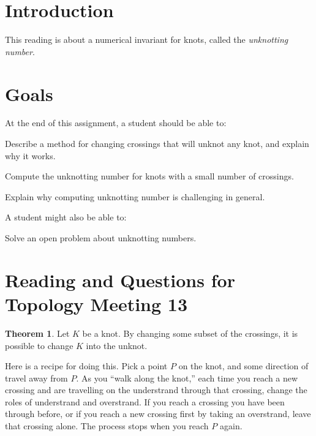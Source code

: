 \documentclass[12pt,letterpaper]{article}
\theoremstyle{definition}
\newtheorem*{theorem}{Theorem}
\begin{document}
\setlength{\parskip}{1ex plus 0.5ex minus 0.2ex}
\setlength{\parindent}{0pt}

\pagestyle{fancy}
\cfoot{}

\section*{Introduction}
This reading is about a numerical invariant for knots, called the \emph{unknotting number}.

\section*{Goals}
At the end of this assignment, a student should be able to:
\begin{compactitem}
\item Describe a method for changing crossings that will unknot any knot, and explain why it works.
\item Compute the unknotting number for knots with a small number of crossings.
\item Explain why computing unknotting number is challenging in general.
\end{compactitem}
A student might also be able to:
\begin{compactitem}
\item Solve an open problem about unknotting numbers.
\end{compactitem}

\section*{Reading and Questions for Topology Meeting 13}

\begin{theorem}
Let $K$ be a knot.
By changing some subset of the crossings, it is possible to change $K$ into the unknot.
\end{theorem}

Here is a recipe for doing this.
Pick a point $P$ on the knot, and some direction of travel away from $P$.
As you ``walk along the knot,'' each time you reach a new crossing and are travelling on the understrand through that crossing, change the roles of understrand and overstrand.
If you reach a crossing you have been through before, or if you reach a new crossing first by taking an overstrand, leave that crossing alone.
The process stops when you reach $P$ again.
\end{document}
